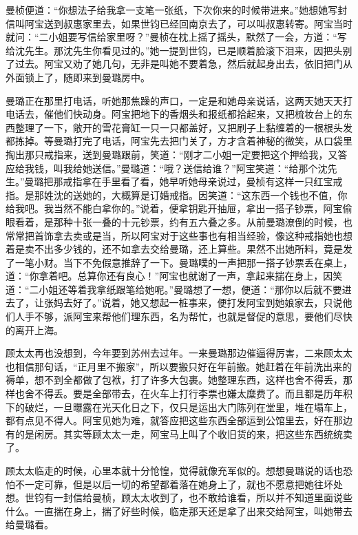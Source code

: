\par 曼桢便道：“你想法子给我拿一支笔一张纸，下次你来的时候带进来。”她想她写封信叫阿宝送到叔惠家里去，如果世钧已经回南京去了，可以叫叔惠转寄。阿宝当时就问：“二小姐要写信给家里呀？”曼桢在枕上摇了摇头，默然了一会，方道：“写给沈先生。那沈先生你看见过的。”她一提到世钧，已是顺着脸滚下泪来，因把头别了过去。阿宝又劝了她几句，无非是叫她不要着急，然后就起身出去，依旧把门从外面锁上了，随即来到曼璐房中。
\par 曼璐正在那里打电话，听她那焦躁的声口，一定是和她母亲说话，这两天她天天打电话去，催他们快动身。阿宝把地下的香烟头和报纸都拾起来，又把梳妆台上的东西整理了一下，敞开的雪花膏缸一只一只都盖好，又把刷子上黏缠着的一根根头发都拣掉。等曼璐打完了电话，阿宝先去把门关了，方才含着神秘的微笑，从口袋里掏出那只戒指来，送到曼璐跟前，笑道：“刚才二小姐一定要把这个押给我，又答应给我钱，叫我给她送信。”曼璐道：“哦？送信给谁？”阿宝笑道：“给那个沈先生。”曼璐把那戒指拿在手里看了看，她早听她母亲说过，曼桢有这样一只红宝戒指。是那姓沈的送她的，大概算是订婚戒指。因笑道：“这东西一个钱也不值，你给我吧。我当然不能白拿你的。”说着，便拿钥匙开抽屉，拿出一搭子钞票，阿宝偷眼看着，是那种十张一叠的十元钞票，约有五六叠之多。从前曼璐潦倒的时候，也常常把首饰拿去卖或是当，所以阿宝对于这些事也有相当经验，像这种戒指她也想着是卖不出多少钱的，还不如拿去交给曼璐，还上算些。果然不出她所料，竟是发了一笔小财。当下不免假意推辞了一下。曼璐噗的一声把那一搭子钞票丢在桌上，道：“你拿着吧。总算你还有良心！”阿宝也就谢了一声，拿起来揣在身上，因笑道：“二小姐还等着我拿纸跟笔给她呢。”曼璐想了一想，便道：“那你以后就不要进去了，让张妈去好了。”说着，她又想起一桩事来，便打发阿宝到她娘家去，只说他们人手不够，派阿宝来帮他们理东西，名为帮忙，也就是督促的意思，要他们尽快的离开上海。
\par 顾太太再也没想到，今年要到苏州去过年。一来曼璐那边催逼得厉害，二来顾太太也相信那句话，“正月里不搬家”，所以要搬只好在年前搬。她赶着在年前洗出来的褥单，想不到全都做了包袱，打了许多大包裹。她整理东西，这样也舍不得丢，那样也舍不得丢。要是全部带去，在火车上打行李票也嫌太糜费了。而且都是历年积下的破烂，一旦曝露在光天化日之下，仅只是运出大门陈列在堂里，堆在塌车上，都有点见不得人。阿宝见她为难，就答应把这些东西全部运到公馆里去，好在那边有的是闲房。其实等顾太太一走，阿宝马上叫了个收旧货的来，把这些东西统统卖了。
\par 顾太太临走的时候，心里本就十分怆惶，觉得就像充军似的。想想曼璐说的话也恐怕不一定可靠，但是以后一切的希望都着落在她身上了，就也不愿意把她往坏处想。世钧有一封信给曼桢，顾太太收到了，也不敢给谁看，所以并不知道里面说些什么。一直揣在身上，揣了好些时候，临走那天还是拿了出来交给阿宝，叫她带去给曼璐看。
